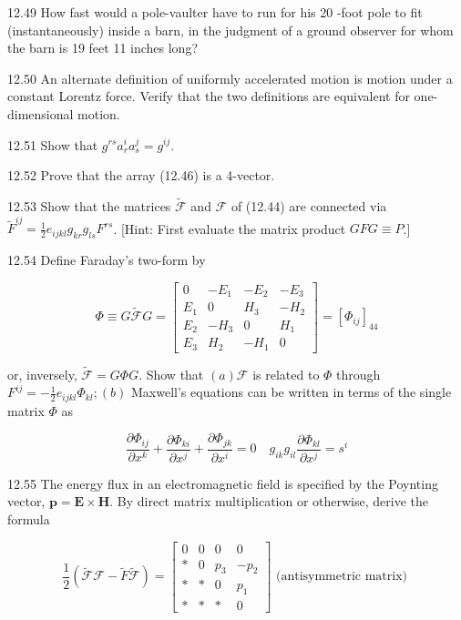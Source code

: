 \documentclass[10pt]{article}
\begin{document}
12.49 How fast would a pole-vaulter have to run for his 20 -foot pole to fit (instantaneously) inside a barn, in the judgment of a ground observer for whom the barn is 19 feet 11 inches long?

12.50 An alternate definition of uniformly accelerated motion is motion under a constant Lorentz force. Verify that the two definitions are equivalent for one-dimensional motion.

12.51 Show that $g^{r s} a_{r}^{i} a_{s}^{j}=g^{i j}$.

12.52 Prove that the array (12.46) is a 4-vector.

12.53 Show that the matrices $\tilde{\mathscr{F}}$ and $\mathscr{F}$ of (12.44) are connected via $\tilde{F}^{i j}=\frac{1}{2} e_{i j k l} g_{k r} g_{l s} F^{r s}$. [Hint: First evaluate the matrix product $G F G \equiv P$.]

12.54 Define Faraday's two-form by

$$
\Phi \equiv G \tilde{\mathscr{F}} G=\left[\begin{array}{cccc}
0 & -E_{1} & -E_{2} & -E_{3} \\
E_{1} & 0 & H_{3} & -H_{2} \\
E_{2} & -H_{3} & 0 & H_{1} \\
E_{3} & H_{2} & -H_{1} & 0
\end{array}\right]=\left[\Phi_{i j}\right]_{44}
$$

or, inversely, $\tilde{\mathscr{F}}=G \Phi G$. Show that $(a) \mathscr{F}$ is related to $\Phi$ through $F^{i j}=-\frac{1}{2} e_{i j k l} \Phi_{k l} ;(b)$ Maxwell's equations can be written in terms of the single matrix $\Phi$ as

$$
\frac{\partial \Phi_{i j}}{\partial x^{k}}+\frac{\partial \Phi_{k i}}{\partial x^{j}}+\frac{\partial \Phi_{j k}}{\partial x^{i}}=0 \quad g_{i k} g_{i l} \frac{\partial \Phi_{k l}}{\partial x^{j}}=s^{i}
$$

12.55 The energy flux in an electromagnetic field is specified by the Poynting vector, $\mathbf{p}=\mathbf{E} \times \mathbf{H}$. By direct matrix multiplication or otherwise, derive the formula

$$
\frac{1}{2}(\tilde{\mathscr{F}} \mathscr{F}-\tilde{F} \tilde{\mathscr{F}})=\left[\begin{array}{cccc}
0 & 0 & 0 & 0 \\
* & 0 & p_{3} & -p_{2} \\
* & * & 0 & p_{1} \\
* & * & * & 0
\end{array}\right] \text { (antisymmetric matrix) }
$$
\end{document}
